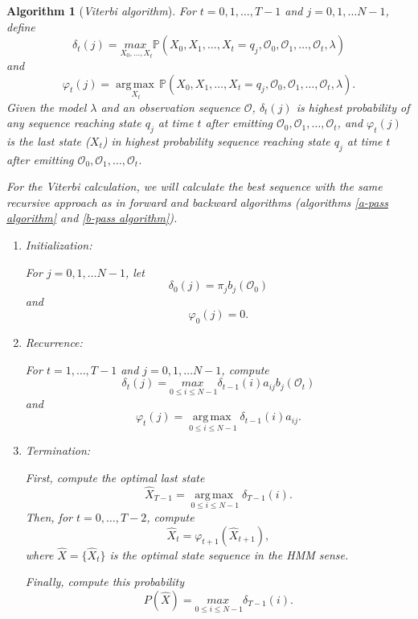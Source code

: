 \documentclass[12pt]{article}
\newtheorem{algorithm2}{Algorithm}
\def\OO{\mathcal{O}}
\def\PP{\mathbb{P}}
\DeclareMathOperator{\argmax}{arg\,max\,}
\numberwithin{equation}{section}
\begin{document}
\begin{algorithm2}[\emph{Viterbi algorithm}]\label{Viterbi algorithm}
\normalfont For $t = 0,1, \dots, T-1$ and $j = 0,1, \dots N-1$, define
\begin{equation}\label{delta}
    \delta_{t}(j) = \underset{X_{0}, \dots, X_{t}}{max\,} \PP(X_{0}, X_{1}, \dots, X_{t} = q_{j}, \OO_{0}, \OO_{1}, \dots, \OO_{t}, \lambda)
\end{equation}
and
\begin{equation}\label{varphi}
    \varphi_{t}(j) = \underset{X_{t}}{\argmax} \PP(X_{0}, X_{1}, \dots, X_{t} = q_{j}, \OO_{0}, \OO_{1}, \dots, \OO_{t}, \lambda).
\end{equation}
Given the model $\lambda$ and an observation sequence $\OO$, $\delta_{t}(j)$ is highest probability of any sequence reaching state $q_{j}$ at time $t$ after emitting $\OO_{0}, \OO_{1}, \dots, \OO_{t}$, and $\varphi_{t}(j)$ is the last state ($X_{t}$) in highest probability sequence reaching state $q_{j}$ at time $t$ after emitting $\OO_{0}, \OO_{1}, \dots, \OO_{t}$.

For the Viterbi calculation, we will calculate the best sequence with the same recursive approach as in forward and backward algorithms (algorithms \ref{a-pass algorithm} and \ref{b-pass algorithm}).

\begin{enumerate}
    \item Initialization:

    For $j = 0,1, \dots N-1$, let
    \[\delta_{0}(j) = \pi_{j} b_{j}(\OO_{0})\] and \[\varphi_{0}(j) = 0.\]

    \item Recurrence:

    For $t = 1, \dots, T-1$ and $j = 0,1, \dots N-1$, compute
    \[\delta_{t}(j) = \underset{0 \leq i \leq N-1}{max\,} \delta_{t-1}(i) a_{ij} b_{j}(\OO_{t})\]
    and
    \[\varphi_{t}(j) = \underset{0 \leq i \leq N-1}{\argmax} \delta_{t-1}(i) a_{ij}.\]

    \item Termination:

    First, compute the optimal last state 
    \[\hat{X}_{T-1} = \underset{0 \leq i \leq N-1}{\argmax} \delta_{T-1}(i).\]
    Then, for $t = 0, \dots, T-2$, compute
    \[\hat{X}_{t} = \varphi_{t+1}(\hat{X}_{t+1}),\]
    where $\hat{X} = \{\hat{X}_{t}\}$ is the optimal state sequence in the HMM sense.

    Finally, compute this probability
    \[P(\hat{X}) = \underset{0 \leq i \leq N-1}{max\,} \delta_{T-1}(i).\]
\end{enumerate}
\end{algorithm2}
\end{document}
